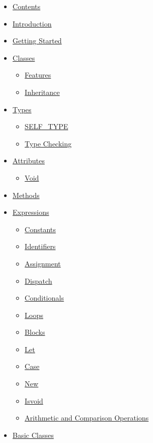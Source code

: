 \documentclass[]{article}
\begin{document}
\begin{itemize}
\itemsep1pt\parskip0pt
\item
  \href{node1.html}{Contents}
\item
  \href{node2.html}{Introduction}
\item
  \href{node3.html}{Getting Started}
\item
  \href{node4.html}{Classes}

  \begin{itemize}
  \itemsep1pt\parskip0pt
  \item
    \href{node5.html}{Features}
  \item
    \href{node6.html}{Inheritance}
  \end{itemize}
\item
  \href{node7.html}{Types}

  \begin{itemize}
  \itemsep1pt\parskip0pt
  \item
    \href{node8.html}{SELF\_TYPE}
  \item
    \href{node9.html}{Type Checking}
  \end{itemize}
\item
  \href{node10.html}{Attributes}

  \begin{itemize}
  \itemsep1pt\parskip0pt
  \item
    \href{node11.html}{Void}
  \end{itemize}
\item
  \href{node12.html}{Methods}
\item
  \href{node13.html}{Expressions}

  \begin{itemize}
  \itemsep1pt\parskip0pt
  \item
    \href{node14.html}{Constants}
  \item
    \href{node15.html}{Identifiers}
  \item
    \href{node16.html}{Assignment}
  \item
    \href{node17.html}{Dispatch}
  \item
    \href{node18.html}{Conditionals}
  \item
    \href{node19.html}{Loops}
  \item
    \href{node20.html}{Blocks}
  \item
    \href{node21.html}{Let}
  \item
    \href{node22.html}{Case}
  \item
    \href{node23.html}{New}
  \item
    \href{node24.html}{Isvoid}
  \item
    \href{node25.html}{Arithmetic and Comparison Operations}
  \end{itemize}
\item
  \href{node26.html}{Basic Classes}


\end{itemize}
\end{document}
